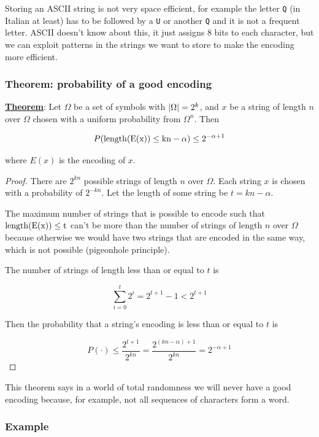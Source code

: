 \documentclass[12pt]{extarticle}
\begin{document}
Storing an ASCII string is not very space efficient, for example the letter \texttt{Q} (in Italian at least) has to be followed by a \texttt{U} or another \texttt{Q} and it is not a frequent letter.
ASCII doesn't know about this, it just assigns 8 bits to each character, but we can exploit patterns in the strings we want to store to make the encoding more efficient.

\subsubsection{Theorem: probability of a good encoding}

\textbf{\underline{Theorem}}: Let $\Omega$ be a set of symbols with $\abs{\Omega} = 2^k$, and $x$ be a string of length $n$ over $\Omega$ chosen with a uniform probability from $\Omega^n$.
Then

$$
    P(\operatorfont{length}(E(x)) \leq kn - \alpha) \leq 2^{-\alpha +1}
$$

where $E(x)$ is the encoding of $x$.

\begin{proof}
    There are $2^{kn}$ possible strings of length $n$ over $\Omega$. Each string $x$ is chosen with a probability of $2^{-kn}$.
    Let the length of some string be $t = kn - \alpha$.

    The maximum number of strings that is possible to encode such that $\operatorfont{length}(E(x)) \leq t$ can't be more than the number of strings of length $n$ over $\Omega$ because otherwise we would have two strings that are encoded in the same way, which is not possible (pigeonhole principle).

    The number of strings of length less than or equal to $t$ is

    $$
        \sum_{i=0}^{t} 2^{i} = 2^{t+1} - 1 < 2^{t+1}
    $$

    Then the probability that a string's encoding is less than or equal to $t$ is

    $$
        P(\cdot) \leq \frac{2^{t+1}}{2^{kn}} = \frac{2^{(kn - \alpha) + 1}}{2^{kn}} = 2^{-\alpha + 1}
    $$
\end{proof}

This theorem says in a world of total randomness we will never have a good encoding because, for example, not all sequences of characters form a word.

\subsubsection{Example}
\end{document}
